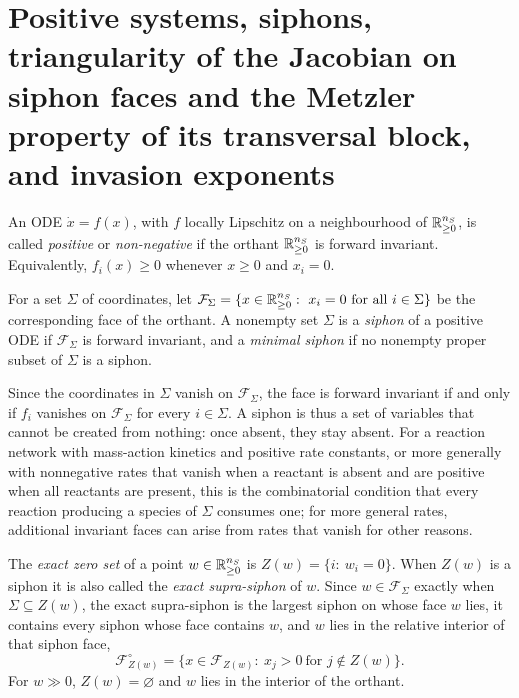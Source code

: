 \section{Positive systems, siphons, triangularity of the Jacobian on siphon faces and the Metzler property of its transversal block, and invasion exponents}\label{ss:siphons}

An ODE $\dot x=f(x)$, with $f$ locally Lipschitz on a neighbourhood of
$\mathbb{R}^{n_S}_{\ge0}$, is called \emph{positive} \cite{rantzer2015scalable} or
\emph{non-negative} \cite{haddad2010} if the orthant $\mathbb{R}^{n_S}_{\ge0}$ is forward
invariant. Equivalently, $f_i(x)\ge0$ whenever $x\ge0$ and $x_i=0$.
\eeD

For a set $\Sigma$ of coordinates, let
$\mathcal F_\Sigma=\{x\in\mathbb{R}^{n_S}_{\ge0}:\ x_i=0\ \text{for all } i\in\Sigma\}$
be the corresponding face of the orthant. A nonempty set $\Sigma$ is a
\emph{siphon} of a positive ODE if $\mathcal F_\Sigma$ is forward invariant, and
a \emph{minimal siphon} if no nonempty proper subset of $\Sigma$ is a siphon.
\eeD

Since the coordinates in $\Sigma$ vanish on $\mathcal F_\Sigma$, the face is
forward invariant if and only if $f_i$ vanishes on $\mathcal F_\Sigma$ for
every $i\in\Sigma$. A siphon is thus a set of variables that cannot be created
from nothing: once absent, they stay absent. For a reaction network with
mass-action kinetics and positive rate constants, or more generally with nonnegative rates that vanish when a reactant is absent
and are positive when all reactants are present, this is the
combinatorial condition that every reaction producing a species of $\Sigma$
consumes one; for more general rates, additional invariant faces can arise from
rates that vanish for other reasons.

The \emph{exact zero set} of a point $w\in\mathbb{R}^{n_S}_{\ge0}$ is $Z(w)=\{i:\ w_i=0\}$. When $Z(w)$ is
a siphon it is also called the \emph{exact supra-siphon} of $w$. Since $w\in\mathcal F_\Sigma$
exactly when $\Sigma\subseteq Z(w)$, the exact supra-siphon is the largest siphon on whose face
$w$ lies, it contains every siphon whose face contains $w$, and $w$ lies in the relative interior of that
siphon face,
\[
\mathcal F^\circ_{Z(w)}=\{x\in\mathcal F_{Z(w)}:\ x_j>0\ \text{for } j\notin Z(w)\}.
\]
For $w\gg0$, $Z(w)=\varnothing$ and $w$ lies in the interior of the orthant.
\eeD



